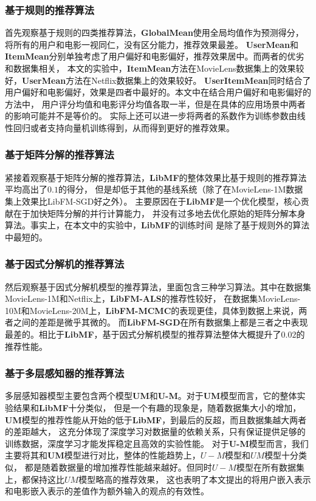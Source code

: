 \subsubsection{基于规则的推荐算法}
首先观察基于规则的四类推荐算法，\textbf{GlobalMean}使用全局均值作为预测得分，将所有的用户和电影一视同仁，没有区分能力，推荐效果最差。
\textbf{UserMean}和\textbf{ItemMean}分别单独考虑了用户偏好和电影偏好，推荐效果居中。而两者的优劣和数据集相关，
本文的实验中，\textbf{ItemMean}方法在MovieLens数据集上的效果较好，\textbf{UserMean}方法在Netflix数据集上的效果较好。
\textbf{UserItemMean}同时结合了用户偏好和电影偏好，效果是四者中最好的。本文中在结合用户偏好和电影偏好的方法中，
用户评分均值和电影评分均值各取一半，但是在具体的应用场景中两者的影响可能并不是等价的。
实际上还可以进一步将两者的系数作为训练参数由线性回归或者支持向量机训练得到，从而得到更好的推荐效果。

\subsubsection{基于矩阵分解的推荐算法}
紧接着观察基于矩阵分解的推荐算法，\textbf{LibMF}的整体效果比基于规则的推荐算法平均高出了$0.1$的得分，
但是却低于其他的基线系统（除了在MovieLens-1M数据集上效果比LibFM-SGD好之外）。
主要原因在于\textbf{LibMF}是一个优化模型，核心贡献在于加快矩阵分解的并行计算能力，
并没有过多地去优化原始的矩阵分解本身算法。事实上，在本文中的实验中，\textbf{LibMF}的训练时间
是除了基于规则外的算法中最短的。

\subsubsection{基于因式分解机的推荐算法}
然后观察基于因式分解机模型的推荐算法，里面包含三种学习算法。其中在数据集MovieLens-1M和Netflix上，\textbf{LibFM-ALS}的推荐性较好，
在数据集MovieLens-10M和MovieLens-20M上，\textbf{LibFM-MCMC}的表现更佳，具体到数据上来说，两者之间的差距是微乎其微的。
而\textbf{LibFM-SGD}在所有数据集上都是三者之中表现最差的。相比于\textbf{LibMF}，基于因式分解机模型的推荐算法整体大概提升了$0.02$的推荐性能。

\subsubsection{基于多层感知器的推荐算法}
多层感知器模型主要包含两个模型\textbf{UM}和\textbf{U-M}。对于\textbf{UM}模型而言，它的整体实验结果和\textbf{LibMF}十分类似，
但是一个有趣的现象是，随着数据集大小的增加，\textbf{UM}模型的推荐性能从开始的低于\textbf{LibMF}，到最后的反超，而且数据集越大两者的差距越大，
这充分体现了深度学习对数据量的依赖关系，只有保证提供足够的训练数据，深度学习才能发挥稳定且高效的实验性能。
对于\textbf{U-M}模型而言，我们主要将其和\textbf{UM}模型进行对比，整体的性能趋势上，$U-M$模型和$UM$模型十分类似，
都是随着数据量的增加推荐性能越来越好。但同时$U-M$模型在所有数据集上，都保持这比$UM$模型略高的推荐效果，
这也表明了本文提出的将用户嵌入表示和电影嵌入表示的差值作为额外输入的观点的有效性。

